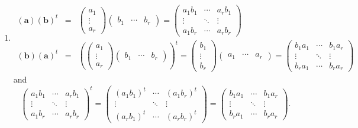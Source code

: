 \documentclass[aps,preprint]{revtex4}
\begin{document}
\begin{enumerate}
\begin{enumerate}
\begin{enumerate}
\item 
\begin{eqnarray}
\left( \boldsymbol{a}\right) \left( \boldsymbol{b}\right) ^{t} &=&\left( 
\begin{array}{c}
a_{1} \\ 
\vdots \\ 
a_{r}%
\end{array}%
\right) \left( 
\begin{array}{ccc}
b_{1} & \cdots & b_{r}%
\end{array}%
\right) =\left( 
\begin{array}{ccc}
a_{1}b_{1} & \cdots & a_{r}b_{1} \\ 
\vdots & \ddots & \vdots \\ 
a_{1}b_{r} & \cdots & a_{r}b_{r}%
\end{array}%
\right) \\
\left( \boldsymbol{b}\right) \left( \boldsymbol{a}\right) ^{t} &=&\left(
\left( 
\begin{array}{c}
a_{1} \\ 
\vdots \\ 
a_{r}%
\end{array}%
\right) \left( 
\begin{array}{ccc}
b_{1} & \cdots & b_{r}%
\end{array}%
\right) \right) ^{t}=\left( 
\begin{array}{c}
b_{1} \\ 
\vdots \\ 
b_{r}%
\end{array}%
\right) \left( 
\begin{array}{ccc}
a_{1} & \cdots & a_{r}%
\end{array}%
\right) =\left( 
\begin{array}{ccc}
b_{1}a_{1} & \cdots & b_{1}a_{r} \\ 
\vdots & \ddots & \vdots \\ 
b_{r}a_{1} & \cdots & b_{r}a_{r}%
\end{array}%
\right)
\end{eqnarray}%
and 
\begin{equation}
\left( 
\begin{array}{ccc}
a_{1}b_{1} & \cdots & a_{r}b_{1} \\ 
\vdots & \ddots & \vdots \\ 
a_{1}b_{r} & \cdots & a_{r}b_{r}%
\end{array}%
\right) ^{t}=\left( 
\begin{array}{ccc}
\left( a_{1}b_{1}\right) ^{t} & \cdots & \left( a_{1}b_{r}\right) ^{t} \\ 
\vdots & \ddots & \vdots \\ 
\left( a_{r}b_{1}\right) ^{t} & \cdots & \left( a_{r}b_{r}\right) ^{t}%
\end{array}%
\right) =\left( 
\begin{array}{ccc}
b_{1}a_{1} & \cdots & b_{1}a_{r} \\ 
\vdots & \ddots & \vdots \\ 
b_{r}a_{1} & \cdots & b_{r}a_{r}%
\end{array}%
\right) .
\end{equation}


\end{enumerate}
\end{enumerate}
\end{enumerate}
\end{document}
